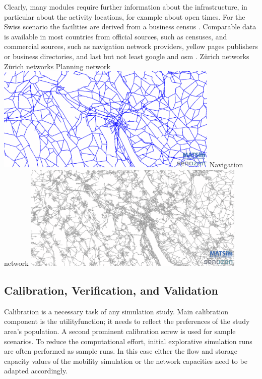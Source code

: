 Clearly, many modules require further information about the infrastructure, in particular about the activity locations, for example about open times. For the Swiss scenario the facilities are derived from a business census \citep[][]{SwissEnterpriseCensus_manual_2001}. Comparable data is available in most countries from official sources, such as censuses, and commercial sources, such as navigation network providers, yellow pages publishers or business directories, and last but not least google and \gls{osm} \citep[][]{OpenStreetMap_Webpage_2015}.
%
\createfigure%
{Zürich networks}%
{Zürich networks}%
{\label{fig:zhnetwork}}%
{%
  \createsubfigure%
  {Planning network}%
  {\includegraphics[width=0.8\textwidth,angle=0]{using/figures/planning.png}}%
  {\label{fig:planningnetwork}}%
  {}%
  \createsubfigure%
  {Navigation network}%
	{\includegraphics[width=0.8\textwidth,angle=0]{using/figures/navigation.png}}%
  {\label{fig:navigationnetwork}}%
  {}%
}%
{}

\subsection{Calibration, Verification, and Validation}
Calibration is a necessary task of any simulation study. Main calibration component is the \gls{utilityfunction}; it needs to reflect the preferences of the study area's population. A second prominent calibration screw is used for sample \glspl{scenario}. To reduce the computational effort, initial explorative simulation runs are often performed as sample runs. In this case either the flow and storage capacity values of the mobility simulation or the network capacities need to be adapted accordingly.

